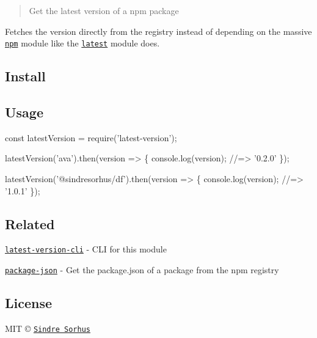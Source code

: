 \begin{quote}
Get the latest version of a npm package \end{quote}


Fetches the version directly from the registry instead of depending on the massive \href{https://github.com/npm/npm/blob/8b5e7b6ae5b4cd2d7d62eaf93b1428638b387072/package.json#L37-L85}{\tt npm} module like the \href{https://github.com/bahamas10/node-latest}{\tt latest} module does.

\subsection*{Install}




\subsection*{Usage}


\begin{DoxyCode}
const latestVersion = require('latest-version');

latestVersion('ava').then(version => \{
    console.log(version);
    //=> '0.2.0'
\});

latestVersion('@sindresorhus/df').then(version => \{
    console.log(version);
    //=> '1.0.1'
\});
\end{DoxyCode}


\subsection*{Related}


\begin{DoxyItemize}
\item \href{https://github.com/sindresorhus/latest-version-cli}{\tt latest-\/version-\/cli} -\/ C\+LI for this module
\item \href{https://github.com/sindresorhus/package-json}{\tt package-\/json} -\/ Get the package.\+json of a package from the npm registry
\end{DoxyItemize}

\subsection*{License}

M\+IT © \href{http://sindresorhus.com}{\tt Sindre Sorhus} 